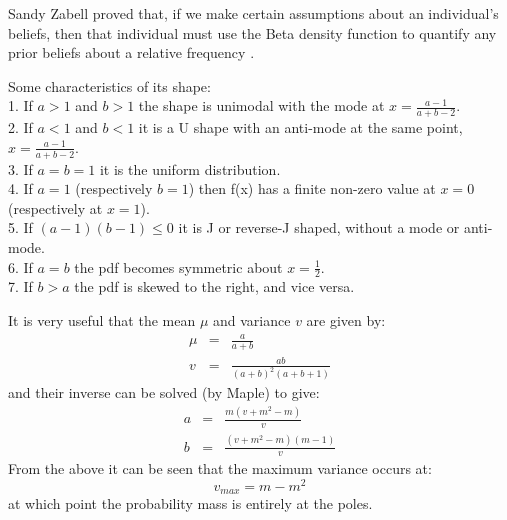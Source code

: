 Sandy Zabell \citep*{Zabell1982} proved that, if we make certain assumptions about an individual's beliefs, then that individual must use the Beta density function to quantify any prior beliefs about a relative frequency \citep*{Neapolitan2004}.



Some characteristics of its shape:\\
1. If $a > 1$ and $b > 1$ the shape is unimodal with the mode at $x = \frac{a - 1}{a + b - 2}$.\\
2. If $a < 1$ and $b < 1$ it is a U shape with an anti-mode at the same point, $x = \frac{a - 1}{a + b - 2}$.\\
3. If $a = b = 1$ it is the uniform distribution.\\
4. If $a = 1$ (respectively $b = 1$) then f(x) has a finite non-zero value at $x = 0$ (respectively at $x = 1$).\\
5. If $(a-1)(b-1) \leq 0$ it is J or reverse-J shaped, without a mode or anti-mode.\\
6. If $a = b$ the pdf becomes symmetric about $x = \frac{1}{2}$.\\
7. If $b > a$ the pdf is skewed to the right, and vice versa.


It is very useful that the mean $\mu$ and variance $v$ are given by:
\begin{eqnarray}
 \mu &=& \frac{a}{a + b} \\
 v   &=& \frac{ab}{(a + b)^2 (a + b + 1)}
\end{eqnarray}
and their inverse can be solved (by Maple) to give:
\begin{eqnarray}
 a &=& \frac{m(v + m^2 - m)}{v} \\
 b &=& \frac{(v + m^2 -m)(m - 1)}{v}
\end{eqnarray}
From the above it can be seen that the maximum variance occurs at:
$$ v_{max} = m - m^2 $$
at which point the probability mass is entirely at the poles.

